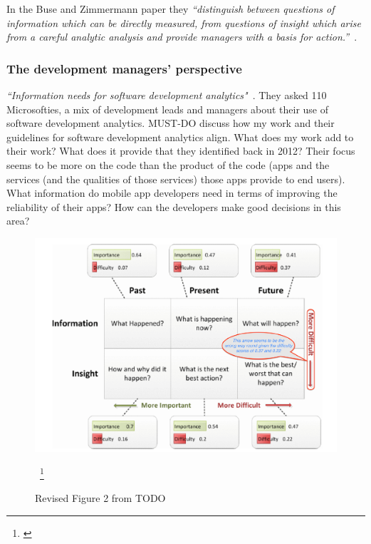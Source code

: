 In the Buse and Zimmermann paper they \emph{``distinguish between questions of information which can be directly measured, from questions of insight which arise from a careful analytic analysis and provide managers with a basis for action.''}~\cite{buse_analytics_2010}.

\subsubsection{The development managers' perspective}
\emph{``Information needs for software development analytics"}~\cite{buse2012_information_needs_for_software_development_analytics}. They asked 110 Microsofties, a mix of development leads and managers about their use of software development analytics. MUST-DO discuss how my work and their guidelines for software development analytics align. What does my work add to their work? What does it provide that they identified back in 2012? Their focus seems to be more on the code than the product of the code (apps and the services (and the qualities of those services) those apps provide to end users). What information do mobile app developers need in terms of improving the reliability of their apps? How can the developers make good decisions in this area?


\begin{figure}
    \centering
    \includegraphics[width=\linewidth]{images/related-work/buse2012-edited-figure-2.pdf}
    \caption{Revised Figure 2 from TODO}~\footnote{\cite{buse2012_information_needs_for_software_development_analytics}}
    \label{fig:buse2012-edited-figure-2}
\end{figure}


